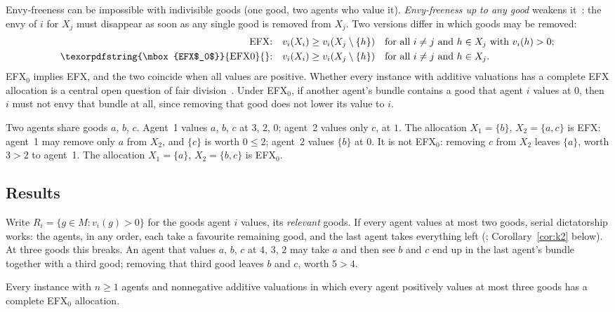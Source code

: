 \documentclass[runningheads,11pt]{llncs}
\newcommand{\efxz}{\texorpdfstring{\mbox{EFX$_0$}}{EFX0}}
\newcommand{\st}{\mathrel{:}}
\begin{document}
Envy-freeness can be impossible with indivisible goods (one good, two agents who value it). \emph{Envy-freeness up to any good} weakens it~\cite{AmanatidisBFV22}: the envy of $i$ for $X_j$ must disappear as soon as any single good is removed from $X_j$. Two versions differ in which goods may be removed:
\begin{align*}
\text{EFX:}&\quad v_i(X_i)\ge v_i(X_j\setminus\{h\})\quad\text{for all } i\ne j \text{ and } h\in X_j \text{ with } v_i(h)>0;\\
\text{\efxz{}:}&\quad v_i(X_i)\ge v_i(X_j\setminus\{h\})\quad\text{for all } i\ne j \text{ and } h\in X_j.
\end{align*}
\efxz{} implies EFX, and the two coincide when all values are positive. Whether every instance with additive valuations has a complete EFX allocation is a central open question of fair division~\cite{AmanatidisBFV22}. Under \efxz{}, if another agent's bundle contains a good that agent $i$ values at $0$, then $i$ must not envy that bundle at all, since removing that good does not lower its value to $i$.

\begin{example}[EFX, but not \efxz{}]\label{ex:efx-vs-efx0}
Two agents share goods $a$, $b$, $c$. Agent~1 values $a$, $b$, $c$ at $3$, $2$, $0$; agent~2 values only $c$, at $1$. The allocation $X_1=\{b\}$, $X_2=\{a,c\}$ is EFX: agent~1 may remove only $a$ from $X_2$, and $\{c\}$ is worth $0\le2$; agent~2 values $\{b\}$ at $0$. It is not \efxz{}: removing $c$ from $X_2$ leaves $\{a\}$, worth $3>2$ to agent~1. The allocation $X_1=\{a\}$, $X_2=\{b,c\}$ is \efxz{}.
\end{example}

\subsection{Results}\label{sec:results}

Write $R_i=\{g\in M\st v_i(g)>0\}$ for the goods agent $i$ values, its \emph{relevant} goods. If every agent values at most two goods, serial dictatorship works: the agents, in any order, each take a favourite remaining good, and the last agent takes everything left (\cite{MrdEfx}; Corollary~\ref{cor:k2} below). At three goods this breaks. An agent that values $a$, $b$, $c$ at $4$, $3$, $2$ may take $a$ and then see $b$ and $c$ end up in the last agent's bundle together with a third good; removing that third good leaves $b$ and $c$, worth $5>4$.

\begin{theorem}[existence]\label{thm:target}
Every instance with $n\ge1$ agents and nonnegative additive valuations in which every agent positively values at most three goods has a complete \efxz{} allocation.
\end{theorem}
\end{document}
